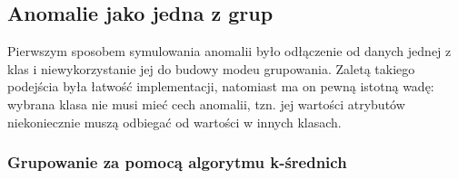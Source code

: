 \documentclass[11pt,a4paper,twoside]{article}
\begin{document}

\newpage
\subsection {Anomalie jako jedna z grup}

Pierwszym sposobem symulowania anomalii było odłączenie od danych jednej z klas i niewykorzystanie jej do budowy modeu grupowania. Zaletą takiego podejścia była łatwość implementacji, natomiast ma on pewną istotną wadę: wybrana klasa nie musi mieć cech anomalii, tzn. jej wartości atrybutów niekoniecznie muszą odbiegać od wartości w innych klasach.


\subsubsection{Grupowanie za pomocą algorytmu k-średnich }

\end{document}
